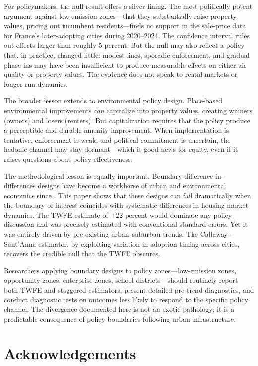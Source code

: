 \documentclass[12pt]{article}
\begin{document}
For policymakers, the null result offers a silver lining. The most politically potent argument against low-emission zones---that they substantially raise property values, pricing out incumbent residents---finds no support in the sale-price data for France's later-adopting cities during 2020--2024. The confidence interval rules out effects larger than roughly 5 percent. But the null may also reflect a policy that, in practice, changed little: modest fines, sporadic enforcement, and gradual phase-ins may have been insufficient to produce measurable effects on either air quality or property values. The evidence does not speak to rental markets or longer-run dynamics.

The broader lesson extends to environmental policy design. Place-based environmental improvements \textit{can} capitalize into property values, creating winners (owners) and losers (renters). But capitalization requires that the policy produce a perceptible and durable amenity improvement. When implementation is tentative, enforcement is weak, and political commitment is uncertain, the hedonic channel may stay dormant---which is good news for equity, even if it raises questions about policy effectiveness.

The methodological lesson is equally important. Boundary difference-in-differences designs have become a workhorse of urban and environmental economics since \citet{black1999better}. This paper shows that these designs can fail dramatically when the boundary of interest coincides with systematic differences in housing market dynamics. The TWFE estimate of $+$22 percent would dominate any policy discussion and was precisely estimated with conventional standard errors. Yet it was entirely driven by pre-existing urban--suburban trends. The Callaway--Sant'Anna estimator, by exploiting variation in adoption timing across cities, recovers the credible null that the TWFE obscures.

Researchers applying boundary designs to policy zones---low-emission zones, opportunity zones, enterprise zones, school districts---should routinely report both TWFE and staggered estimators, present detailed pre-trend diagnostics, and conduct diagnostic tests on outcomes less likely to respond to the specific policy channel. The divergence documented here is not an exotic pathology; it is a predictable consequence of policy boundaries following urban infrastructure.


\section*{Acknowledgements}
\end{document}
